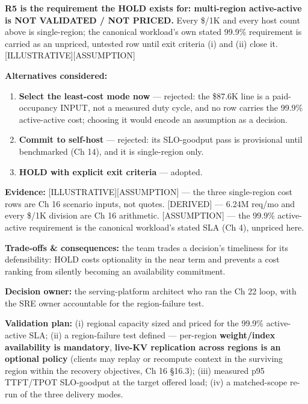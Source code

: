 \textbf{R5 is the requirement the HOLD exists for: multi-region
active-active is NOT VALIDATED / NOT PRICED.} Every \$/1K and every host
count above is single-region; the canonical workload's own stated 99.9\%
requirement is carried as an unpriced, untested row until exit criteria
(i) and (ii) close it. \mbox{{[}ILLUSTRATIVE{]}}\hspace{0pt}\mbox{{[}ASSUMPTION{]}}

\textbf{Alternatives considered:}

\begin{enumerate}
\def\labelenumi{\arabic{enumi}.}
\tightlist
\item
  \textbf{Select the least-cost mode now} --- rejected: the \$87.6K line
  is a paid-occupancy INPUT, not a measured duty cycle, and no row
  carries the 99.9\% active-active cost; choosing it would encode an
  assumption as a decision.
\item
  \textbf{Commit to self-host} --- rejected: its SLO-goodput pass is
  provisional until benchmarked (Ch 14), and it is single-region only.
\item
  \textbf{HOLD with explicit exit criteria} --- adopted.
\end{enumerate}

\textbf{Evidence:} \mbox{{[}ILLUSTRATIVE{]}}\hspace{0pt}\mbox{{[}ASSUMPTION{]}} --- the three
single-region cost rows are Ch 16 scenario inputs, not quotes.
\mbox{{[}DERIVED{]}} --- 6.24M req/mo and every \$/1K division are Ch 16
arithmetic. \mbox{{[}ASSUMPTION{]}} --- the 99.9\% active-active requirement is
the canonical workload's stated SLA (Ch 4), unpriced here.

\textbf{Trade-offs \& consequences:} the team trades a decision's
timeliness for its defensibility: HOLD costs optionality in the near
term and prevents a cost ranking from silently becoming an availability
commitment.

\textbf{Decision owner:} the serving-platform architect who ran the Ch
22 loop, with the SRE owner accountable for the region-failure test.

\textbf{Validation plan:} (i) regional capacity sized and priced for the
99.9\% active-active SLA; (ii) a region-failure test defined ---
per-region \textbf{weight/index availability is mandatory},
\textbf{live-KV replication across regions is an optional policy}
(clients may replay or recompute context in the surviving region within
the recovery objectives, Ch 16 §16.3); (iii) measured p95 TTFT/TPOT
SLO-goodput at the target offered load; (iv) a matched-scope re-run of
the three delivery modes.

